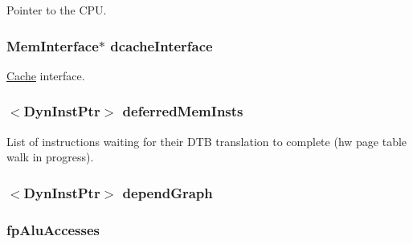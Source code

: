 \label{classInstructionQueue_a1379cf882a12ac6fc9eba5da7c84b18b}
Pointer to the CPU. \hypertarget{classInstructionQueue_a22dc8294eecb144fbdd951d2e32e9330}{
\subsubsection[{dcacheInterface}]{\setlength{\rightskip}{0pt plus 5cm}MemInterface$\ast$ {\bf dcacheInterface}}}
\label{classInstructionQueue_a22dc8294eecb144fbdd951d2e32e9330}
\hyperlink{classCache}{Cache} interface. \hypertarget{classInstructionQueue_a6ea0c1a972364b789a8b6831cf7828cf}{
\subsubsection[{deferredMemInsts}]{$<${\bf DynInstPtr}$>$ {\bf deferredMemInsts}}}
\label{classInstructionQueue_a6ea0c1a972364b789a8b6831cf7828cf}
List of instructions waiting for their DTB translation to complete (hw page table walk in progress). \hypertarget{classInstructionQueue_a23fbbb46c9bdd183c06095cc0398fdc4}{
\subsubsection[{dependGraph}]{$<${\bf DynInstPtr}$>$ {\bf dependGraph}}}
\label{classInstructionQueue_a23fbbb46c9bdd183c06095cc0398fdc4}
\hypertarget{classInstructionQueue_a1dd5fc6a847750f4294e41e801b47bf4}{
\subsubsection[{fpAluAccesses}]{ {\bf fpAluAccesses}}}
